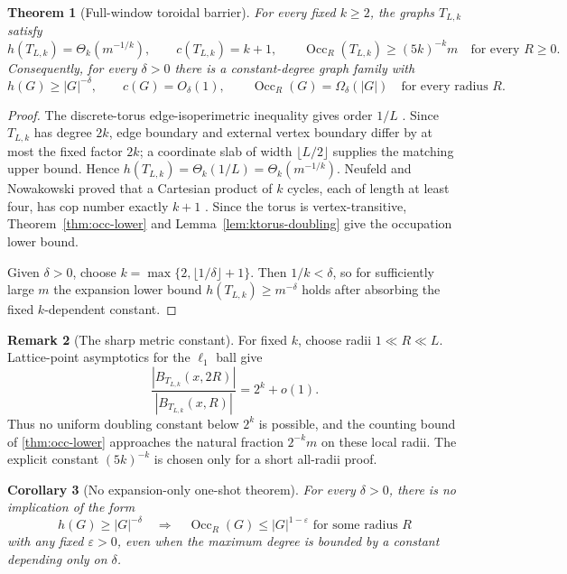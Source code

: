 \documentclass[11pt]{amsart}
\newtheorem{theorem}{Theorem}[section]
\newtheorem{corollary}[theorem]{Corollary}
\theoremstyle{definition}
\newtheorem{remark}[theorem]{Remark}
\newcommand{\cnum}{c}
\newcommand{\eps}{\varepsilon}
\newcommand{\Occ}{\operatorname{Occ}}
\begin{document}
\begin{theorem}[Full-window toroidal barrier]\label{thm:full-window}
For every fixed $k\ge2$, the graphs $T_{L,k}$ satisfy
\[
 \boxed{
 h(T_{L,k})=\Theta_k(m^{-1/k}),
 \qquad
 \cnum(T_{L,k})=k+1,
 \qquad
 \Occ_R(T_{L,k})\ge (5k)^{-k}m
 \quad\text{for every }R\ge0.
 }
\]
Consequently, for every $\delta>0$ there is a constant-degree graph family
with
\[
 h(G)\ge |G|^{-\delta},
 \qquad
 c(G)=O_\delta(1),
 \qquad
 \Occ_R(G)=\Omega_\delta(|G|)
 \quad\text{for every radius }R.
\]
\end{theorem}

\begin{proof}
The discrete-torus edge-isoperimetric inequality gives order $1/L$
\cite{BL}.  Since $T_{L,k}$ has degree $2k$, edge boundary and external
vertex boundary differ by at most the fixed factor $2k$; a coordinate slab of
width $\lfloor L/2\rfloor$ supplies the matching upper bound.  Hence
$h(T_{L,k})=\Theta_k(1/L)=\Theta_k(m^{-1/k})$.  Neufeld and Nowakowski proved
that a Cartesian product of $k$ cycles, each of length at least four, has cop
number exactly $k+1$ \cite{NeufeldNowakowski}.  Since the torus is
vertex-transitive, Theorem~\ref{thm:occ-lower} and
Lemma~\ref{lem:ktorus-doubling} give the occupation lower bound.

Given $\delta>0$, choose $k=\max\{2,\lfloor1/\delta\rfloor+1\}$.  Then $1/k<\delta$, so for sufficiently large $m$ the expansion
lower bound $h(T_{L,k})\ge m^{-\delta}$ holds after absorbing the fixed
$k$-dependent constant.
\end{proof}

\begin{remark}[The sharp metric constant]
For fixed $k$, choose radii $1\ll R\ll L$.  Lattice-point asymptotics for the
$\ell_1$ ball give
\[
 \frac{|B_{T_{L,k}}(x,2R)|}{|B_{T_{L,k}}(x,R)|}=2^k+o(1).
\]
Thus no uniform doubling constant below $2^k$ is possible, and the counting
bound of \cref{thm:occ-lower} approaches the natural fraction $2^{-k}m$ on
these local radii.  The explicit constant $(5k)^{-k}$ is chosen only for a
short all-radii proof.
\end{remark}

\begin{corollary}[No expansion-only one-shot theorem]\label{cor:no-exp-occ}
For every $\delta>0$, there is no implication of the form
\[
 h(G)\ge |G|^{-\delta}
 \quad\Longrightarrow\quad
 \Occ_R(G)\le |G|^{1-\eps}
 \text{ for some radius $R$}
\]
with any fixed $\eps>0$, even when the maximum degree is bounded by a constant
depending only on $\delta$.
\end{corollary}
\end{document}
